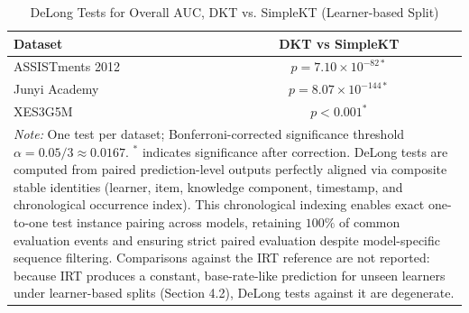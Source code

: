 \begin{table}[htbp]
\caption{DeLong Tests for Overall AUC, DKT vs. SimpleKT (Learner-based Split)}
\label{tab:delong_overall}
\centering
\scriptsize
\setlength{\tabcolsep}{3pt}
\begin{tabular}{lc}
\toprule
\textbf{Dataset} & \textbf{DKT vs SimpleKT} \\
\midrule
ASSISTments 2012 & $p = 7.10 \times 10^{-82*}$ \\
Junyi Academy    & $p = 8.07 \times 10^{-144*}$ \\
XES3G5M          & $p < 0.001^{*}$ \\
\bottomrule
\multicolumn{2}{p{11.5cm}}{\textit{Note:} One test per dataset; Bonferroni-corrected significance threshold $\alpha = 0.05/3 \approx 0.0167$. $^{*}$ indicates significance after correction. DeLong tests are computed from paired prediction-level outputs perfectly aligned via composite stable identities (learner, item, knowledge component, timestamp, and chronological occurrence index). This chronological indexing enables exact one-to-one test instance pairing across models, retaining $100\%$ of common evaluation events and ensuring strict paired evaluation despite model-specific sequence filtering. Comparisons against the IRT reference are not reported: because IRT produces a constant, base-rate-like prediction for unseen learners under learner-based splits (Section 4.2), DeLong tests against it are degenerate.} \\
\end{tabular}
\end{table}
